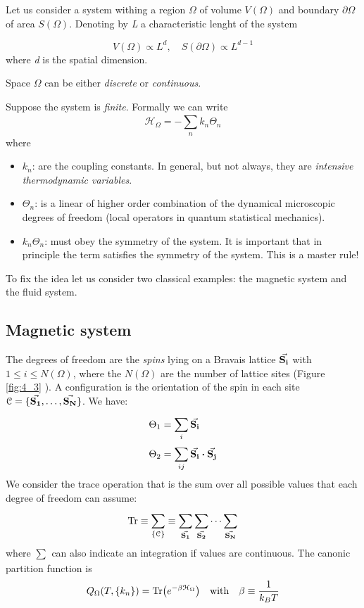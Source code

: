 \documentclass[../main/main.tex]{subfiles}
\begin{document}
Let us consider a system withing a region \( \Omega  \) of volume \( V(\Omega ) \) and boundary \( \partial{\Omega }  \)    of area \( S (\Omega ) \). Denoting by \emph{L} a characteristic lenght of the system

\begin{equation}
  V(\Omega ) \propto L^d, \quad S(\partial{\Omega } ) \propto L^{d-1}
\end{equation}
where \emph{d} is the spatial dimension.
\begin{remark}
Space \( \Omega  \) can be either \emph{discrete} or \emph{continuous}.
\end{remark}
Suppose the system is \emph{finite}. Formally we can write
\begin{equation}
  \mathcal{H}_{\Omega } = - \sum_{n}^{} k_n \Theta _n
\end{equation}
where
\begin{itemize}
  \item \( k_n \): are the coupling constants. In general, but not always, they are  \emph{intensive thermodynamic variables}.
  \item \( \Theta _n \): is a linear of higher order combination of the dynamical microscopic degrees of freedom (local operators in quantum statistical mechanics).
  \item \( k_n \Theta _n \): must obey the symmetry of the system. It is important that in principle the term satisfies the symmetry of the system. This is a master rule!
\end{itemize}
To fix the idea let us consider two classical examples: the magnetic system and the fluid system.

\subsection{Magnetic system}
The degrees of freedom are the \emph{spins} lying on a Bravais lattice \( \va{S_i}  \) with \( 1 \le i \le N(\Omega ) \), where the \( N(\Omega )   \) are the number of lattice sites (Figure \ref{fig:4_3} ). A configuration is the orientation of the spin in each site \( \mathcal{C} = \{ \va{S_1},\dots,\va{S_N} \}  \).
We have:
\begin{subequations}
\begin{align}
  \Theta _1 &=  \sum_{i}^{} \va{S_i} \\
  \Theta _2 &= \sum_{ij}^{} \va{S_i} \vdot \va{S_j}
\end{align}
\end{subequations}
We consider the trace operation that is the sum over all possible values that each degree of freedom can assume:
\begin{equation}
  \Tr \equiv \sum_{\{ \mathcal{C} \}  }^{}  \equiv \sum_{\va{S_1} }^{} \sum_{\va{S_2} }^{} \dots  \sum_{\va{S_N} }^{}
\end{equation}
where \( \sum_{}^{}   \) can also indicate an integration if values are continuous.
The canonic partition function is
\begin{equation}
  Q_ \Omega (T, \{ k_n \} ) = \Tr( e^{-\beta \mathcal{H }_ \Omega} ) \quad \text{with} \quad \beta \equiv \frac{1}{k_B T}
\end{equation}
\end{document}
